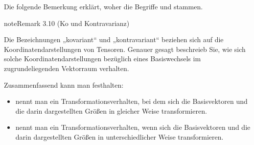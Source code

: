 \documentclass[letterpaper,10pt,german]{jupyterBook}
\begin{document}
\sphinxAtStartPar
Die folgende Bemerkung erklärt, woher die Begriffe  und  stammen.
\label{vektoranalysis/tensor:remark-20}
\begin{sphinxadmonition}{note}{Remark 3.10 (Ko\sphinxhyphen{} und Kontravarianz)}



\sphinxAtStartPar
Die Bezeichnungen „kovariant“ und „kontravariant“ beziehen sich auf die Koordinatendarstellungen von Tensoren.
Genauer gesagt beschreieb Sie, wie sich solche Koordinatendarstellungen bezüglich eines Basiswechsels im zugrundeliegenden Vektorraum verhalten.

\sphinxAtStartPar
Zusammenfassend kann man festhalten:
\begin{itemize}
\item {} 
\sphinxAtStartPar
{} nennt man ein Transformationsverhalten, bei dem sich die Basisvektoren und die darin dargestellten Größen in gleicher Weise transformieren.

\item {} 
\sphinxAtStartPar
{} nennt man ein Transformationsverhalten, wenn sich die Basisvektoren und die darin dargestellten Größen in unterschiedlicher Weise transformieren.

\end{itemize}
\end{sphinxadmonition}
\end{document}
